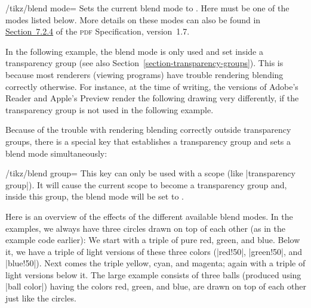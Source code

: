 \begin{key}{/tikz/blend mode=}
    Sets the current blend mode to . Here  must be one of
    the modes listed below. More details on these modes can also be found in
    \href{https://opensource.adobe.com/dc-acrobat-sdk-docs/pdfstandards/pdfreference1.7old.pdf\#G12.12449365}{Section~7.2.4}
    of the \textsc{pdf} Specification, version~1.7.

    In the following example, the blend mode is only used and set inside a
    transparency group (see also Section~\ref{section-transparency-groups}).
    This is because most renderers (viewing programs) have trouble rendering
    blending correctly otherwise. For instance, at the time of writing, the
    versions of Adobe's Reader and Apple's Preview render the following drawing
    very differently, if the transparency group is not used in the following
    example.
\begin{codeexample}[]
\end{codeexample}

    Because of the trouble with rendering blending correctly outside
    transparency groups, there is a special key that establishes a transparency
    group and sets a blend mode simultaneously:

    \begin{key}{/tikz/blend group=}
        This key can only be used with a scope (like |transparency group|). It
        will cause the current scope to become a transparency group and, inside
        this group, the blend mode will be set to .
\begin{codeexample}[]
\end{codeexample}
    \end{key}

    Here is an overview of the effects of the different available blend modes.
    In the examples, we always have three circles drawn on top of each other
    (as in the example code earlier): We start with a triple of pure red,
    green, and blue. Below it, we have a triple of light versions of these
    three colors (|red!50|, |green!50|, and |blue!50|). Next comes the triple
    yellow, cyan, and magenta; again with a triple of light versions below it.
    The large example consists of three balls (produced using |ball color|)
    having the colors red, green, and blue, are drawn on top of each other just
    like the circles.


\end{key}
